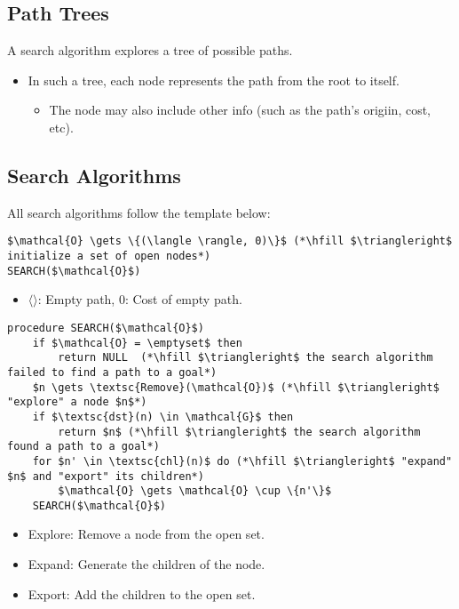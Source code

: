 \subsection{Path Trees}
\begin{definition}
    A search algorithm explores a tree of possible paths. 
    \begin{itemize}
        \item In such a tree, each node represents the path from the root to itself.
        \begin{itemize}
            \item The node may also include other info (such as the path's origiin, cost, etc).
        \end{itemize}
    \end{itemize}
\end{definition}

\subsection{Search Algorithms}
\begin{algo}
    All search algorithms follow the template below:

\begin{lstlisting}
$\mathcal{O} \gets \{(\langle \rangle, 0)\}$ (*\hfill $\triangleright$ initialize a set of open nodes*) 
SEARCH($\mathcal{O}$)
\end{lstlisting}
\begin{itemize}
    \item $\langle \rangle$: Empty path, $0$: Cost of empty path.
\end{itemize}

\begin{lstlisting}
procedure SEARCH($\mathcal{O}$)
    if $\mathcal{O} = \emptyset$ then
        return NULL  (*\hfill $\triangleright$ the search algorithm failed to find a path to a goal*)
    $n \gets \textsc{Remove}(\mathcal{O})$ (*\hfill $\triangleright$ "explore" a node $n$*)
    if $\textsc{dst}(n) \in \mathcal{G}$ then
        return $n$ (*\hfill $\triangleright$ the search algorithm found a path to a goal*)
    for $n' \in \textsc{chl}(n)$ do (*\hfill $\triangleright$ "expand" $n$ and "export" its children*)
        $\mathcal{O} \gets \mathcal{O} \cup \{n'\}$ 
    SEARCH($\mathcal{O}$)
\end{lstlisting}
\begin{itemize}
    \item Explore: Remove a node from the open set.
    \item Expand: Generate the children of the node.
    \item Export: Add the children to the open set.
\end{itemize}

\end{algo}

